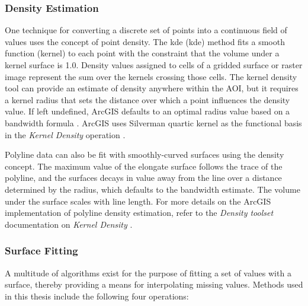 \subsubsection{Density Estimation}\label{ch3:density_est}

One technique for converting a discrete set of points into a continuous field of values uses the concept of point density. The \acrlong{kde} (\acrshort{kde}) method fits a smooth function (kernel) to each point with the constraint that the volume under a kernel surface is 1.0. Density values assigned to cells of a gridded surface or raster image represent the sum over the kernels crossing those cells. The kernel density tool can provide an estimate of density anywhere within the AOI, but it requires a kernel radius that sets the distance over which a point influences the density value. If left undefined, ArcGIS defaults to an optimal radius value based on a bandwidth formula \citep{esri_kernel_2021}. ArcGIS uses Silverman quartic kernel as the functional basis in the \textit{Kernel Density} operation \citep{esri_kernel_2021,silverman_density_1986}.

Polyline data can also be fit with smoothly-curved surfaces using the density concept. The maximum value of the elongate surface follows the trace of the polyline, and the surfaces decays in value away from the line over a distance determined by the radius, which defaults to the bandwidth estimate. The volume under the surface scales with line length. For more details on the ArcGIS implementation of polyline density estimation, refer to the \textit{Density toolset} documentation on \textit{Kernel Density} \citep{esri_kernel_2021}.

\subsubsection{Surface Fitting}\label{ch3:surface_fit}
A multitude of algorithms exist for the purpose of fitting a set of values with a surface, thereby providing a means for interpolating missing values. Methods used in this thesis include the following four operations:

